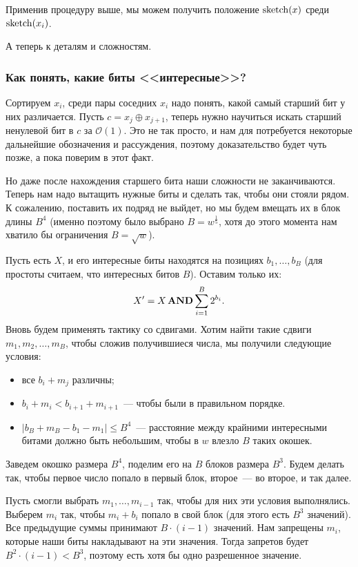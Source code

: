 Применив процедуру выше, мы можем получить положение $\operatorname{sketch}(x)$ среди $\operatorname{sketch}(x_i)$. 

\smallskip

А теперь к деталям и сложностям.

\subsubsection{Как понять, какие биты <<интересные>>?}

Сортируем $x_i$, среди пары соседних $x_i$ надо понять, какой самый старший бит у них различается. Пусть $c = x_j \oplus x_{j+1}$, теперь нужно научиться искать старший ненулевой бит в $c$ за $\mathcal{O}(1)$. Это не так просто, и нам для потребуется некоторые дальнейшие обозначения и рассуждения, поэтому доказательство будет чуть позже, а пока поверим в этот факт.

\bigskip

Но даже после нахождения старшего бита наши сложности не заканчиваются. Теперь нам надо вытащить нужные биты и сделать так, чтобы они стояли рядом. К сожалению, поставить их подряд не выйдет, но мы будем вмещать их в блок длины $B^4$ (именно поэтому было выбрано $B = w^{\frac{1}{5}}$, хотя до этого момента нам хватило бы ограничения $B = \sqrt{w}$). 

Пусть есть $X$, и его интересные биты находятся на позициях $b_1, \ldots, b_B$ (для простоты считаем, что интересных битов $B$). Оставим только их: \[ X' = X \operatorname{\mathbf{AND}} \sum\limits_{i=1}^{B} 2^{b_i}. \] Вновь будем применять тактику со сдвигами. Хотим найти такие сдвиги $m_1, m_2, \ldots, m_B$, чтобы сложив получившиеся числа, мы получили следующие условия:

\begin{itemize}
    \item все $b_i+m_j$ различны;
    \item $b_i + m_i < b_{i+1} + m_{i+1}$~--- чтобы были в правильном порядке.
    \item $|b_B + m_B - b_1 - m_1| \leqslant B^4$~--- расстояние между крайними интересными битами должно быть небольшим, чтобы в $w$ влезло $B$ таких окошек.
\end{itemize}

Заведем окошко размера $B^4$, поделим его на $B$ блоков размера $B^3$. Будем делать так, чтобы первое число попало в первый блок, второе~--- во второе, и так далее.

Пусть смогли выбрать $m_1, \ldots, m_{i-1}$ так, чтобы для них эти условия выполнялись. Выберем $m_i$ так, чтобы $m_i + b_i$ попало в свой блок (для этого есть $B^3$ значений). Все предыдущие суммы принимают $B\cdot(i-1)$ значений. Нам запрещены $m_i$, которые наши биты накладывают на эти значения. Тогда запретов будет $B^2\cdot(i-1) < B^3$, поэтому есть хотя бы одно разрешенное значение.

